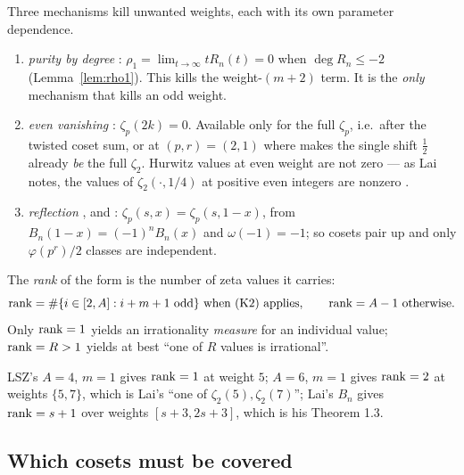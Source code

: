 Three mechanisms kill unwanted weights, each with its own parameter dependence.

\begin{enumerate}[label=\textbf{(K\arabic*)},leftmargin=3.0em,itemsep=3pt]
\item \emph{purity by degree} \PROVED{}: $\rho_1=\lim_{t\to\infty}tR_n(t)=0$ when
      $\deg R_n\le-2$ (Lemma~\ref{lem:rho1}). This kills the weight-$(m+2)$ term. It is the
      \emph{only} mechanism that kills an odd weight.
\item \emph{even vanishing} \PROVED{}: $\zeta_p(2k)=0$. Available only for the full
      $\zeta_p$, i.e.\ after the twisted coset sum, or at $(p,r)=(2,1)$ where
      \cite[Lemma 9]{LSZ2025} makes the single shift $\tfrac12$ already \emph{be} the full
      $\zeta_2$. Hurwitz values at even weight are not zero --- as Lai notes, the values of
      $\zeta_2(\cdot,1/4)$ at positive even integers are nonzero \cite{Lai2025}.
\item \emph{reflection} \PROVED{}, and :
      $\zeta_p(s,x)=\zeta_p(s,1-x)$, from $B_n(1-x)=(-1)^nB_n(x)$ and $\omega(-1)=-1$; so
      cosets pair up and only $\varphi(p^r)/2$ classes are independent.
\end{enumerate}

\begin{definition}[rank]\label{def:rank}
The \emph{rank} of the form is the number of zeta values it carries:
\begin{equation}\label{eq:rank}
 \operatorname{rank}=\#\{i\in[2,A]:i+m+1\ \text{odd}\}\ \text{when (K2) applies},\qquad \operatorname{rank}=A-1\ \text{otherwise}.
\end{equation}
Only $\operatorname{rank}=1$ yields an irrationality \emph{measure} for an individual value; $\operatorname{rank}=R>1$
yields at best ``one of $R$ values is irrational''.
\end{definition}

\begin{finding}\label{find:rankanchors}
 LSZ's $A=4$, $m=1$ gives $\operatorname{rank}=1$ at weight $5$; $A=6$, $m=1$
gives $\operatorname{rank}=2$ at weights $\{5,7\}$, which is Lai's ``one of $\zeta_2(5),\zeta_2(7)$''; Lai's
$B_n$ gives $\operatorname{rank}=s+1$ over weights $[s+3,2s+3]$, which is his Theorem 1.3.
\end{finding}

\subsection{Which cosets must be covered}\label{ss:cosets}

